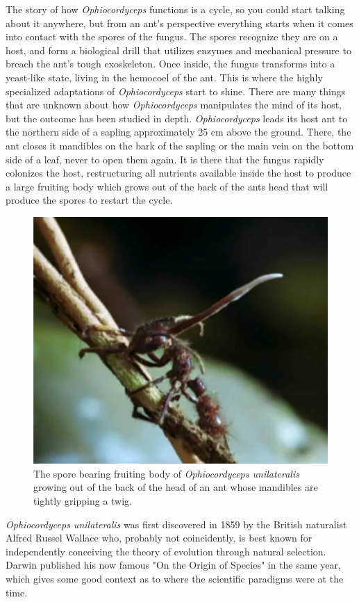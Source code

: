 \documentclass[twocolumn]{article}
\begin{document}
The story of how \textit{Ophiocordyceps} functions is a cycle, so you could start talking about it anywhere, but from an ant's perspective everything starts when it comes into contact with the spores of the fungus. The spores recognize they are on a host, and form a biological drill that utilizes enzymes and mechanical pressure to breach the ant's tough exoskeleton. Once inside, the fungus transforms into a yeast-like state, living in the hemocoel of the ant.\cite{cordy_infection} This is where the highly specialized adaptations of \textit{Ophiocordyceps} start to shine. There are many things that are unknown about how \textit{Ophiocordyceps} manipulates the mind of its host, but the outcome has been studied in depth. \textit{Ophiocordyceps} leads its host ant to the northern side of a sapling approximately 25 cm above the ground. There, the ant closes it mandibles on the bark of the sapling or the main vein on the bottom side of a leaf, never to open them again. It is there that the fungus rapidly colonizes the host, restructuring all nutrients available inside the host to produce a large fruiting body which grows out of the back of the ants head that will produce the spores to restart the cycle.\cite{life_of_dead_ant}

\begin{figure}[!ht]
    \centering
    \includegraphics[width=.4\textwidth]{images/cordyceps_ant.jpg}
    \caption{The spore bearing fruiting body of \textit{Ophiocordyceps unilateralis} growing out of the back of the head of an ant whose mandibles are tightly gripping a twig. }
    \label{fig:cordyceps_ant}
\end{figure}

\textit{Ophiocordyceps unilateralis} was first discovered in 1859 by the British naturalist Alfred Russel Wallace who, probably not coincidently, is best known for independently conceiving the theory of evolution through natural selection. Darwin published his now famous "On the Origin of Species" in the same year, which gives some good context as to where the scientific paradigms were at the time.\cite{darwin} 
\end{document}
